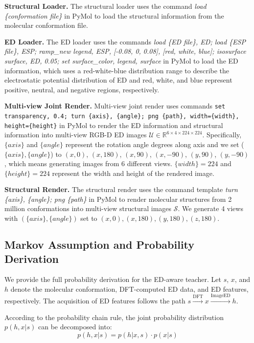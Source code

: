 \textbf{Structural Loader.} The structural loader uses the command \textit{load \{conformation file\}} in PyMol to load the structural information from the molecular conformation file.

\textbf{ED Loader.} The ED loader uses the commands \textit{load \{ED file\}, ED; load \{ESP file\}, ESP; ramp\_new legend, ESP, [-0.08, 0, 0.08], [red, white, blue]; isosurface surface, ED, 0.05; set surface\_color, legend, surface} in PyMol to load the ED information, which uses a red-white-blue distribution range to describe the electrostatic potential distribution of ED and red, white, and blue represent positive, neutral, and negative regions, respectively.

\textbf{Multi-view Joint Render.} Multi-view joint render uses commands \texttt{set transparency, 0.4; turn \{axis\}, \{angle\}; png \{path\}, width=\{width\}, height=\{height\}} in PyMol to render the ED information and structural information into multi-view RGB-D ED images $\mathcal{U}\in\mathbb{R}^{6\times 4\times 224\times 224}$. Specifically, $\{axis\}$ and $\{angle\}$ represent the rotation angle degrees along axis and we set ($\{axis\}, \{angle\}$) to $(x, 0)$, $(x, 180)$, $(x, 90)$, $(x, -90)$, $(y, 90)$, $(y, -90)$, which means generating images from 6 different views. $\{width\}=224$ and $\{height\}=224$ represent the width and height of the rendered image.

\textbf{Structural Render.} The structural render uses the command template \textit{turn \{axis\}, \{angle\}; png \{path\}} in PyMol to render molecular structures from 2 million conformations into multi-view structural images $\mathcal{S}$. We generate 4 views with $(\{axis\}, \{angle\})$ set to $(x, 0), (x, 180), (y, 180), (z, 180)$.


\subsection{Markov Assumption and Probability Derivation}
\label{sec:appendix_markov}

We provide the full probability derivation for the ED-aware teacher. Let $s$, $x$, and $h$ denote the molecular conformation, DFT-computed ED data, and ED features, respectively. The acquisition of ED features follows the path $s\xrightarrow{\text{DFT}}x\xrightarrow{\text{ImageED}}h$.

According to the probability chain rule, the joint probability distribution $p(h,x|s)$ can be decomposed into:
\begin{equation}
p(h,x|s)=p(h|x,s)\cdot p(x|s)
\end{equation}

